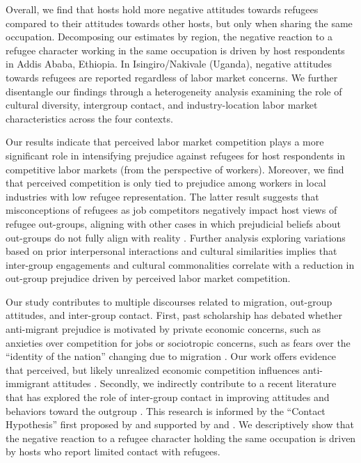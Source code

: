 \documentclass[a4paper,12pt]{article}
\begin{document}
\vspace{5mm}
    

    
Overall, we find that hosts hold more negative attitudes towards refugees compared to their attitudes towards other hosts, but only when sharing the same occupation. Decomposing our estimates by region, the negative reaction to a refugee character working in the same occupation is driven by host respondents in Addis Ababa, Ethiopia. In Isingiro/Nakivale (Uganda), negative attitudes towards refugees are reported regardless of labor market concerns. We further disentangle our findings through a heterogeneity analysis examining the role of cultural diversity, intergroup contact, and industry-location labor market characteristics across the four contexts.

Our results indicate that perceived labor market competition plays a more significant role in intensifying prejudice against refugees for host respondents in competitive labor markets (from the perspective of workers). Moreover, we find that perceived competition is only tied to prejudice among workers in local industries with low refugee representation. The latter result suggests that misconceptions of refugees as job competitors negatively impact host views of refugee out-groups, aligning with other cases in which prejudicial beliefs about out-groups do not fully align with reality \citep{allport1954nature}. Further analysis exploring variations based on prior interpersonal interactions and cultural similarities implies that inter-group engagements and cultural commonalities correlate with a reduction in out-group prejudice driven by perceived labor market competition.

Our study contributes to multiple discourses related to migration, out-group attitudes, and inter-group contact. First, past scholarship has debated whether anti-migrant prejudice is motivated by private economic concerns, such as anxieties over competition for jobs \citep{muller2020individual, mayda2006against} or sociotropic concerns, such as fears over the ``identity of the nation'' changing due to migration \citep{hainmueller2010attitudes, hainmueller2014public}. Our work offers evidence that perceived, but likely unrealized economic competition influences anti-immigrant attitudes \citep{dennison2018}.
Secondly, we indirectly contribute to a recent literature that has explored the role of inter-group contact in improving attitudes and behaviors toward the outgroup \citep{lowe2021, mousa2020building, scacco2018can, betts2023refugees}. This research is informed by the ``Contact Hypothesis'' first proposed by \citet{allport1954nature} and supported by \citet{pettigrew2006meta} and \citet{paluck2019contact}. We descriptively show that the negative reaction to a refugee character holding the same occupation is driven by hosts who report limited contact with refugees.
\end{document}
